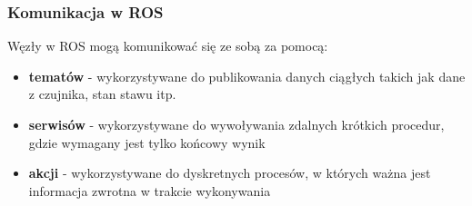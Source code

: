 \addtocounter{framenumber}{-1}
\begin{frame}[plain]
    \frametitle{Komunikacja w ROS}
    Węzły w ROS mogą komunikować się ze sobą za pomocą:
    \begin{itemize}
        \item \textbf{tematów} - wykorzystywane do publikowania danych ciągłych takich jak dane z czujnika, stan stawu itp.
        \item \textbf{serwisów} - wykorzystywane do wywoływania zdalnych krótkich procedur, gdzie wymagany jest tylko końcowy wynik
        \item \textbf{akcji} - wykorzystywane do dyskretnych procesów, w których ważna jest informacja zwrotna w trakcie wykonywania  
    \end{itemize}   
\end{frame}